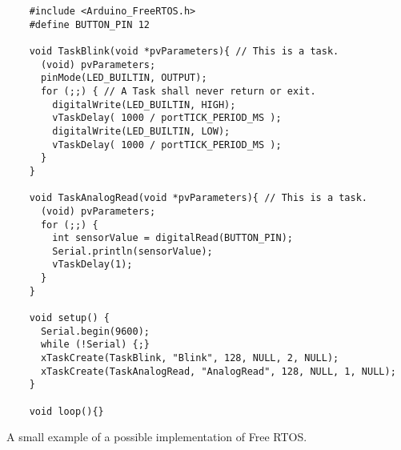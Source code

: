 \begin{listing}[htb!]
  \centering
  \begin{verbatim}
    #include <Arduino_FreeRTOS.h>
    #define BUTTON_PIN 12

    void TaskBlink(void *pvParameters){ // This is a task.
      (void) pvParameters;
      pinMode(LED_BUILTIN, OUTPUT);
      for (;;) { // A Task shall never return or exit.
        digitalWrite(LED_BUILTIN, HIGH);
        vTaskDelay( 1000 / portTICK_PERIOD_MS );
        digitalWrite(LED_BUILTIN, LOW);
        vTaskDelay( 1000 / portTICK_PERIOD_MS );
      }
    }

    void TaskAnalogRead(void *pvParameters){ // This is a task.
      (void) pvParameters;
      for (;;) {
        int sensorValue = digitalRead(BUTTON_PIN);
        Serial.println(sensorValue);
        vTaskDelay(1);
      }
    }

    void setup() {
      Serial.begin(9600);
      while (!Serial) {;}
      xTaskCreate(TaskBlink, "Blink", 128, NULL, 2, NULL);
      xTaskCreate(TaskAnalogRead, "AnalogRead", 128, NULL, 1, NULL);
    }

    void loop(){}
\end{verbatim}
  \caption{A small example of a possible implementation of Free RTOS.}
  \label{lst:freeftosexample}
\end{listing}





